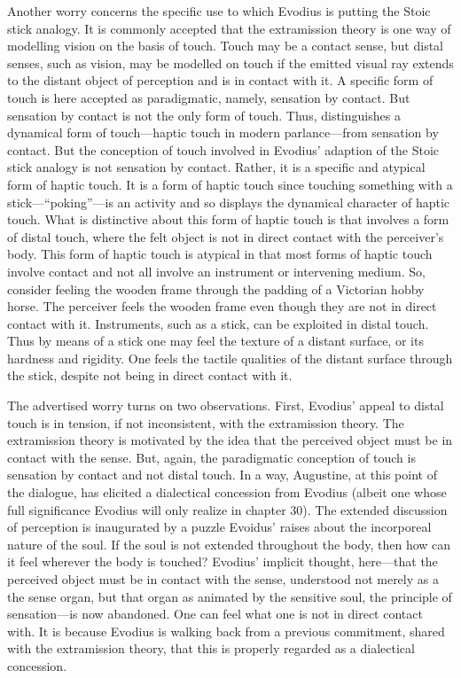 \documentclass[12pt]{article}
\begin{document}
Another worry concerns the specific use to which Evodius is putting the Stoic stick analogy. It is commonly accepted that the extramission theory is one way of modelling vision on the basis of touch. Touch may be a contact sense, but distal senses, such as vision, may be modelled on touch if the emitted visual ray extends to the distant object of perception and is in contact with it. A specific form of touch is here accepted as paradigmatic, namely, sensation by contact. But sensation by contact is not the only form of touch. Thus, \citet{Broad:1952kx} distinguishes a dynamical form of touch---haptic touch in modern parlance---from sensation by contact. But the conception of touch involved in Evodius' adaption of the Stoic stick analogy is not sensation by contact. Rather, it is a specific and atypical form of haptic touch. It is a form of haptic touch since touching something with a stick---``poking''---is an activity and so displays the dynamical character of haptic touch. What is distinctive about this form of haptic touch is that involves a form of distal touch, where the felt object is not in direct contact with the perceiver's body. This form of haptic touch is atypical in that most forms of haptic touch involve contact and not all involve an instrument or intervening medium. So, consider feeling the wooden frame through the padding of a Victorian hobby horse. The perceiver feels the wooden frame even though they are not in direct contact with it. Instruments, such as a stick, can be exploited in distal touch. Thus by means of a stick one may feel the texture of a distant surface, or its hardness and rigidity. One feels the tactile qualities of the distant surface through the stick, despite not being in direct contact with it. 

The advertised worry turns on two observations. First, Evodius' appeal to distal touch is in tension, if not inconsistent, with the extramission theory. The extramission theory is motivated by the idea that the perceived object must be in contact with the sense. But, again, the paradigmatic conception of touch is sensation by contact and not distal touch. In a way, Augustine, at this point of the dialogue, has elicited a dialectical concession from Evodius (albeit one whose full significance Evodius will only realize in chapter 30). The extended discussion of perception is inaugurated by a puzzle Evoidus' raises about the incorporeal nature of the soul. If the soul is not extended throughout the body, then how can it feel wherever the body is touched? Evodius' implicit thought, here---that the perceived object must be in contact with the sense, understood not merely as a the sense organ, but that organ as animated by the sensitive soul, the principle of sensation---is now abandoned. One can feel what one is not in direct contact with. It is because Evodius is walking back from a previous commitment, shared with the extramission theory, that this is properly regarded as a dialectical concession.
\end{document}
